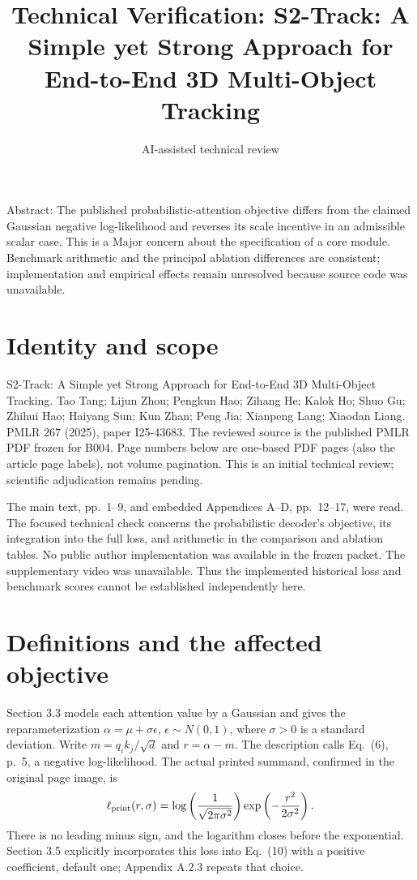 \documentclass[10pt]{article}
\title{Technical Verification: S2-Track: A Simple yet Strong Approach for End-to-End 3D Multi-Object Tracking}
\author{AI-assisted technical review}
\date{}
\begin{document}
\maketitle
Abstract: The published probabilistic-attention objective differs from the claimed Gaussian negative log-likelihood and reverses its scale incentive in an admissible scalar case. This is a Major concern about the specification of a core module. Benchmark arithmetic and the principal ablation differences are consistent; implementation and empirical effects remain unresolved because source code was unavailable.\par
\section*{Identity and scope}
S2-Track: A Simple yet Strong Approach for End-to-End 3D Multi-Object Tracking. Tao Tang; Lijun Zhou; Pengkun Hao; Zihang He; Kalok Ho; Shuo Gu; Zhihui Hao; Haiyang Sun; Kun Zhan; Peng Jia; Xianpeng Lang; Xiaodan Liang. PMLR 267 (2025), paper I25-43683. The reviewed source is the published PMLR PDF frozen for B004. Page numbers below are one-based PDF pages (also the article page labels), not volume pagination. This is an initial technical review; scientific adjudication remains pending.\par
The main text, pp. 1–9, and embedded Appendices A–D, pp. 12–17, were read. The focused technical check concerns the probabilistic decoder’s objective, its integration into the full loss, and arithmetic in the comparison and ablation tables. No public author implementation was available in the frozen packet. The supplementary video was unavailable. Thus the implemented historical loss and benchmark scores cannot be established independently here.\par
\section*{Definitions and the affected objective}
Section 3.3 models each attention value by a Gaussian and gives the reparameterization \(\alpha=\mu+\sigma\epsilon\), \(\epsilon\sim N(0,1)\), where \(\sigma>0\) is a standard deviation. Write \(m=q_i k_j/\sqrt d\) and \(r=\alpha-m\). The description calls Eq. (6), p. 5, a negative log-likelihood. The actual printed summand, confirmed in the original page image, is \[\ell_{\rm print}(r,\sigma)=\log\left(\frac1{\sqrt{2\pi\sigma^2}}\right)\exp\left(-\frac{r^2}{2\sigma^2}\right).\] There is no leading minus sign, and the logarithm closes before the exponential. Section 3.5 explicitly incorporates this loss into Eq. (10) with a positive coefficient, default one; Appendix A.2.3 repeats that choice.\par
\end{document}
